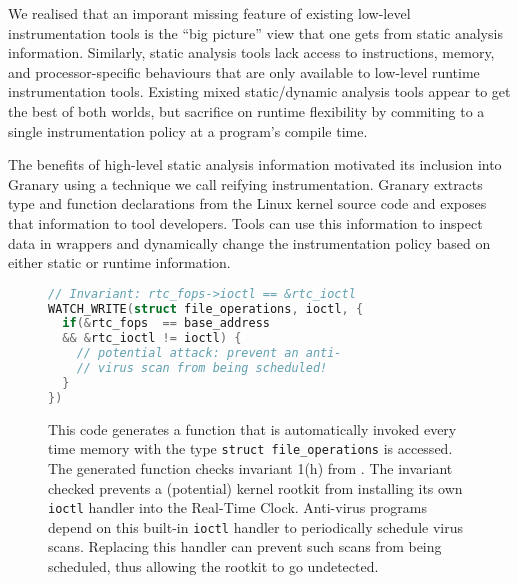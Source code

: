 \documentclass{sigplanconf}
\let\ORIGcaption\caption
\renewcommand{\caption}[2][\compressedcaption]{%
\def\compressedcaption{#2}%
    \vspace{-5pt}%
    \ORIGcaption[#1]{#2}%
    \vspace{-12pt}}
\begin{document}

We realised that an imporant missing feature of existing low-level instrumentation tools is the ``big picture'' view that one gets from static analysis information. Similarly, static analysis tools lack access to instructions, memory, and processor-specific behaviours that are only available to low-level runtime instrumentation tools. Existing mixed static/dynamic analysis tools \cite{NaCl,AddressSanitizer,ThreadSanitizer} appear to get the best of both worlds, but sacrifice on runtime flexibility by commiting to a single instrumentation policy at a program's compile time.

The benefits of high-level static analysis information motivated its inclusion into Granary using a technique we call reifying instrumentation. Granary extracts type and function declarations from the Linux kernel source code and exposes that information to tool developers. Tools can use this information to inspect data in wrappers and dynamically change the instrumentation policy based on either static or runtime information. 

\begin{figure}[t]
\begin{lstlisting}[language=C,basicstyle=\footnotesize\ttfamily]
// Invariant: rtc_fops->ioctl == &rtc_ioctl
WATCH_WRITE(struct file_operations, ioctl, {
  if(&rtc_fops  == base_address
  && &rtc_ioctl != ioctl) {
    // potential attack: prevent an anti-
    // virus scan from being scheduled!
  }
})
\end{lstlisting}
\ORIGcaption{\label{fig:field_invariant_check}This code generates a function that is automatically invoked every time memory with the type \texttt{struct file\_operations} is accessed. The generated function checks invariant 1(h) from \cite{GibraltarKernelInvariants}. The invariant checked prevents a (potential) kernel rootkit from installing its own \texttt{ioctl} handler into the Real-Time Clock. Anti-virus programs depend on this built-in \texttt{ioctl} handler to periodically schedule virus scans. Replacing this handler can prevent such scans from being scheduled, thus allowing the rootkit to go undetected.}
\end{figure}
\end{document}
